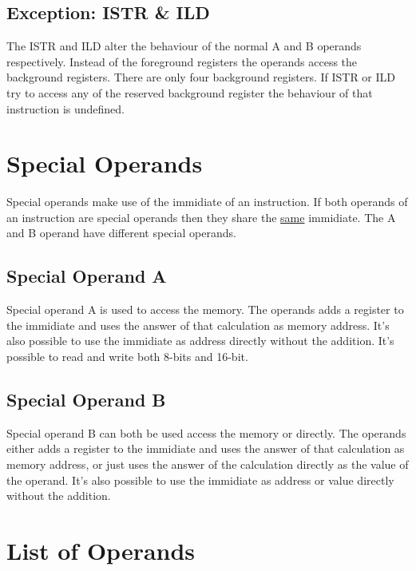 \documentclass[oneside, a4paper]{memoir}
\begin{document}
\subsection{Exception: ISTR \& ILD}
The ISTR and ILD alter the behaviour of the normal A and B operands respectively. Instead of the foreground registers the operands access the background registers. There are only four background registers. If ISTR or ILD try to access any of the reserved background register the behaviour of that instruction is undefined.
\section{Special Operands}
Special operands make use of the immidiate of an instruction. If both operands of an instruction are special operands then they share the \underline{same} immidiate. The A and B operand have different special operands.
\subsection{Special Operand A}
Special operand A is used to access the memory. The operands adds a register to the immidiate and uses the answer of that calculation as memory address. It's also possible to use the immidiate as address directly without the addition. It's possible to read and write both 8-bits and 16-bit.
\subsection{Special Operand B}
Special operand B can both be used access the memory or directly. The operands either adds a register to the immidiate and uses the answer of that calculation as memory address, or just uses the answer of the calculation directly as the value of the operand. It's also possible to use the immidiate as address or value directly without the addition.
\section{List of Operands}
\end{document}
